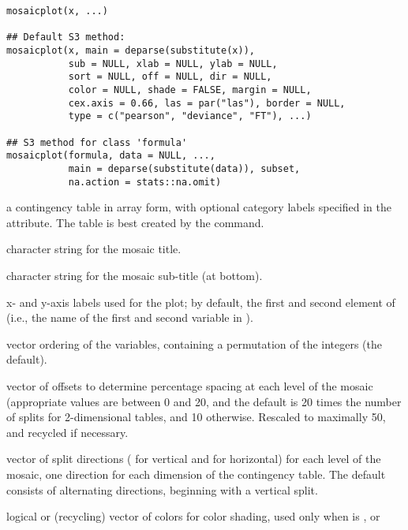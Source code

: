 %
\begin{Usage}
\begin{verbatim}
mosaicplot(x, ...)

## Default S3 method:
mosaicplot(x, main = deparse(substitute(x)), 
           sub = NULL, xlab = NULL, ylab = NULL,
           sort = NULL, off = NULL, dir = NULL,
           color = NULL, shade = FALSE, margin = NULL,
           cex.axis = 0.66, las = par("las"), border = NULL,
           type = c("pearson", "deviance", "FT"), ...)

## S3 method for class 'formula'
mosaicplot(formula, data = NULL, ...,
           main = deparse(substitute(data)), subset,
           na.action = stats::na.omit)
\end{verbatim}
\end{Usage}
%
\begin{Arguments}
\begin{ldescription}
\item[\code{x}] a contingency table in array form, with optional category
labels specified in the  attribute.  The table is
best created by the  command.
\item[\code{main}] character string for the mosaic title.
\item[\code{sub}] character string for the mosaic sub-title (at bottom).
\item[\code{xlab,ylab}] x- and y-axis labels used for the plot; by default,
the first and second element of  (i.e., the
name of the first and second variable in ).
\item[\code{sort}] vector ordering of the variables, containing a permutation
of the integers  (the default).
\item[\code{off}] vector of offsets to determine percentage spacing at each
level of the mosaic (appropriate values are between 0 and 20,
and the default is 20 times the number of splits for 2-dimensional
tables, and 10 otherwise.  Rescaled to maximally 50, and recycled if
necessary.
\item[\code{dir}] vector of split directions ( for vertical and
 for horizontal) for each level of the mosaic, one
direction for each dimension of the contingency table.  The
default consists of alternating directions, beginning with a
vertical split.
\item[\code{color}] logical or (recycling) vector of colors for color
shading, used only when  is , or 

\end{ldescription}
\end{Arguments}
